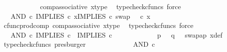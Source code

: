 \begin{isabellebody}
\ \ \ \ \ \ \ \ \ \ \isamarkupfalse%
\ comp{\isacharunderscore}{\kern0pt}associative{}\ x{\isacharunderscore}{\kern0pt}type\ \isamarkupfalse%
\ {\isacharparenleft}{\kern0pt}typecheck{\isacharunderscore}{\kern0pt}cfuncs{\isacharcomma}{\kern0pt}\ force{\isacharparenright}{\kern0pt}\isanewline
\ \ \ \ \ \ \ \ \isamarkupfalse%
\ \isamarkupfalse%
\ {\isachardoublequoteopen}{\isachardot}{\kern0pt}{\isachardot}{\kern0pt}{\isachardot}{\kern0pt}\ {\isacharequal}{\kern0pt}\ AND\ {\isasymcirc}\isactrlsub c\ {\isasymlangle}IMPLIES\ {\isasymcirc}\isactrlsub c\ x{\isacharcomma}{\kern0pt}IMPLIES\ {\isasymcirc}\isactrlsub c\ swap\ {\isasymOmega}\ {\isasymOmega}\ {\isasymcirc}\isactrlsub c\ x{\isasymrangle}{\isachardoublequoteclose}\isanewline
\ \ \ \ \ \ \ \ \ \ \isamarkupfalse%
\ cfunc{\isacharunderscore}{\kern0pt}prod{\isacharunderscore}{\kern0pt}comp\ comp{\isacharunderscore}{\kern0pt}associative{}\ x{\isacharunderscore}{\kern0pt}type\ \isamarkupfalse%
\ {\isacharparenleft}{\kern0pt}typecheck{\isacharunderscore}{\kern0pt}cfuncs{\isacharcomma}{\kern0pt}\ force{\isacharparenright}{\kern0pt}\isanewline
\ \ \ \ \ \ \ \ \isamarkupfalse%
\ \isamarkupfalse%
\ {\isachardoublequoteopen}{\isachardot}{\kern0pt}{\isachardot}{\kern0pt}{\isachardot}{\kern0pt}\ {\isacharequal}{\kern0pt}\ AND\ {\isasymcirc}\isactrlsub c\ {\isasymlangle}IMPLIES\ {\isasymcirc}\isactrlsub c\ {\isasymlangle}{\isasymf}{\isacharcomma}{\kern0pt}{\isasymf}{\isasymrangle}{\isacharcomma}{\kern0pt}\ IMPLIES\ {\isasymcirc}\isactrlsub c\ {\isasymlangle}{\isasymf}{\isacharcomma}{\kern0pt}{\isasymf}{\isasymrangle}{\isasymrangle}{\isachardoublequoteclose}\isanewline
\ \ \ \ \ \ \ \ \ \ \isamarkupfalse%
\ {\isacartoucheopen}p\ {\isacharequal}{\kern0pt}\ {\isasymf}{\isacartoucheclose}\ {\isacartoucheopen}q\ {\isacharequal}{\kern0pt}\ {\isasymf}{\isacartoucheclose}\ swap{\isacharunderscore}{\kern0pt}ap\ x{\isacharunderscore}{\kern0pt}def\ \isamarkupfalse%
\ {\isacharparenleft}{\kern0pt}typecheck{\isacharunderscore}{\kern0pt}cfuncs{\isacharcomma}{\kern0pt}\ presburger{\isacharparenright}{\kern0pt}\isanewline
\ \ \ \ \ \ \ \ \isamarkupfalse%
\ \isamarkupfalse%
\ {\isachardoublequoteopen}{\isachardot}{\kern0pt}{\isachardot}{\kern0pt}{\isachardot}{\kern0pt}\ {\isacharequal}{\kern0pt}\ AND\ {\isasymcirc}\isactrlsub c\ {\isasymlangle}{\isasymt}{\isacharcomma}{\kern0pt}\ {\isasymt}{\isasymrangle}{\isachardoublequoteclose}\isanewline

\end{isabellebody}
